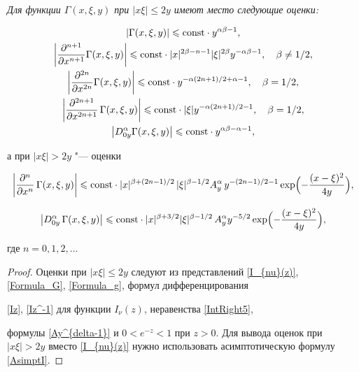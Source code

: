 {\it Для функции $\Gamma(x,\xi,y)$ при  $|x\xi|\leqslant 2y$ имеют место следующие оценки:

\begin{gather*}

\left|\Gamma(x,\xi,y)\right|\leqslant \text{\rm const}\cdot y^{\alpha\beta-1}, 

\\

\left|\frac{\partial^{n+1}}{\partial x^{n+1} } \Gamma(x,\xi,y)\right|\leqslant \text{\rm const}\cdot |x|^{2\beta-n-1} |\xi|^{2\beta} y^{-\alpha\beta-1}, \quad  \beta\neq 1/2,

\\

\left|\frac{\partial^{2n}}{\partial x^{2n} } \Gamma(x,\xi,y)\right|\leqslant \text{\rm const}\cdot y^{-\alpha(2n+1)/2+\alpha-1}, \quad  \beta=1/2,

\\

\left|\frac{\partial^{2n+1}}{\partial x^{2n+1} }\,\Gamma(x,\xi,y)\right|\leqslant \text{\rm const}\cdot |\xi|y^{-\alpha(2n+1)/2-1}, \quad  \beta=1/2,

\\

\left|D^{\alpha}_{0y}\Gamma(x,\xi,y)\right|\leqslant \text{\rm const}\cdot y^{\alpha\beta-\alpha-1},

\end{gather*}

а при $|x\xi| > 2y$ "--- оценки

$$

\left|\frac{\partial^{n}}{\partial x^{n} }\,\Gamma(x,\xi,y)\right|\leqslant \text{\rm const}\cdot |x|^{\beta+(2n-1)/2}\,|\xi|^{\beta-1/2}A^{\alpha}_{y}\,y^{-(2n-1)/2-1}\exp \Bigl( {-\frac{(x-\xi)^2}{4y}}\Bigr),

$$

$$

\left|D^{\alpha}_{0y}\,\Gamma(x,\xi,y)\right|\leqslant \text{\rm const}\cdot |x|^{\beta+3/2}|\xi|^{\beta-1/2}\,

A^{\alpha}_{y}y^{-5/2}\exp \Bigl({-\frac{(x-\xi)^2}{4y}}\Bigr),

$$

где $n=0, 1, 2, \dots$}





\smallskip



\begin{proof} Оценки при $|x\xi|\leqslant2y$ следуют из представлений \eqref{I_{nu}(z)}, \eqref{Formula_G}, \eqref{Formula_g}, формул дифференцирования 

\eqref{Iz}, \eqref{Iz^-1} для функции $I_{\nu}(z)$,  неравенства \eqref{IntRight5},

 формулы \eqref{Ay^{delta-1}} и $0<e^{-z}<1$ при $z>0.$ Для вывода оценок при $|x\xi|> 2y$ вместо \eqref{I_{nu}(z)} нужно использовать асимптотическую формулу \eqref{AsimptI}.

 \end{proof}

